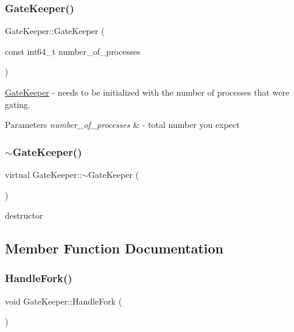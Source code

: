 \subsubsection{\texorpdfstring{Gate\+Keeper()}{GateKeeper()}}
{\footnotesize\ttfamily Gate\+Keeper\+::\+Gate\+Keeper (\begin{DoxyParamCaption}\item[{const int64\+\_\+t}]{number\+\_\+of\+\_\+processes }\end{DoxyParamCaption})}

\hyperlink{class_gate_keeper}{Gate\+Keeper} -\/ needs to be initialized with the number of processes that we\textquotesingle{}re gating. 
\begin{DoxyParams}{Parameters}
{\em number\+\_\+of\+\_\+processes} & -\/ total number you expect \\
\hline
\end{DoxyParams}
\hypertarget{class_gate_keeper_a9c38866d0a0dc540e49fb627e7a4fce6}{}\label{class_gate_keeper_a9c38866d0a0dc540e49fb627e7a4fce6} 
\subsubsection{\texorpdfstring{$\sim$\+Gate\+Keeper()}{~GateKeeper()}}
{\footnotesize\ttfamily virtual Gate\+Keeper\+::$\sim$\+Gate\+Keeper (\begin{DoxyParamCaption}{ }\end{DoxyParamCaption})\hspace{0.3cm}{\ttfamily [virtual]}}

destructor 

\subsection{Member Function Documentation}
\hypertarget{class_gate_keeper_aa3a114e978cecdf1f6b6320bf5895ee7}{}\label{class_gate_keeper_aa3a114e978cecdf1f6b6320bf5895ee7} 
\subsubsection{\texorpdfstring{Handle\+Fork()}{HandleFork()}}
{\footnotesize\ttfamily void Gate\+Keeper\+::\+Handle\+Fork (\begin{DoxyParamCaption}{ }\end{DoxyParamCaption})}

